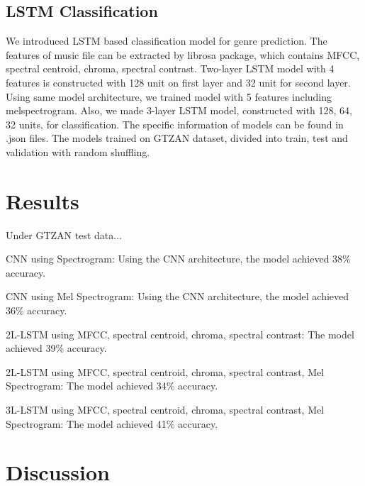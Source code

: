\documentclass{article}
\theoremstyle{plain}
\theoremstyle{definition}
\theoremstyle{remark}
\begin{document}
\subsection{LSTM Classification}
We introduced LSTM based classification model for genre prediction. The features of music file can be extracted by librosa package, which contains MFCC, spectral centroid, chroma, spectral contrast. Two-layer LSTM model with 4 features is constructed with 128 unit on first layer and 32 unit for second layer. Using same model architecture, we trained model with 5 features including melspectrogram. Also, we made 3-layer LSTM model, constructed with 128, 64, 32 units, for classification. The specific information of models can be found in .json files. The models trained on GTZAN dataset, divided into train, test and validation with random shuffling.   
\section{Results}
Under GTZAN test data...

CNN using Spectrogram: Using the CNN architecture, the model achieved 38\% accuracy.

CNN using Mel Spectrogram: Using the CNN architecture, the model achieved 36\% accuracy.

2L-LSTM using MFCC, spectral centroid, chroma, spectral contrast: The model achieved 39\% accuracy.

2L-LSTM using MFCC, spectral centroid, chroma, spectral contrast, Mel Spectrogram: The model achieved 34\% accuracy.

3L-LSTM using MFCC, spectral centroid, chroma, spectral contrast, Mel Spectrogram: The model achieved 41\% accuracy.

\section{Discussion}
\end{document}
